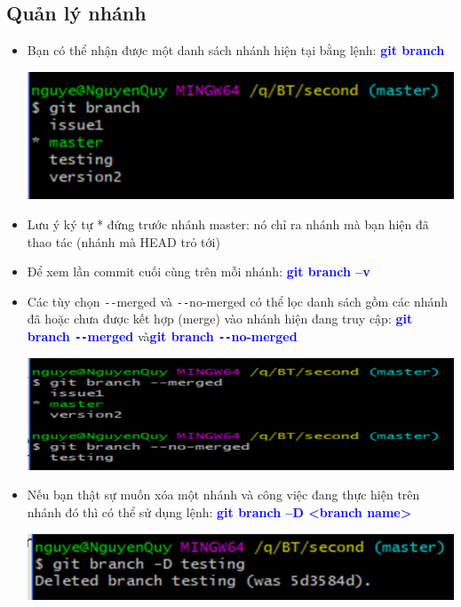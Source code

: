 \documentclass[12pt,a4paper]{report}
\begin{document}
\subsection{Quản lý nhánh}
\begin{itemize}
\item Bạn có thể nhận được một danh sách nhánh hiện tại bằng lệnh: \textcolor{blue}{\bf git branch}

	\includegraphics[width=0.8\linewidth]{screenshot055}
	
	\label{fig:screenshot055}

\item Lưu ý ký tự * đứng trước nhánh master: nó chỉ ra nhánh mà bạn hiện đã thao tác (nhánh mà HEAD trỏ tới)
\item Để xem lần commit cuối cùng trên mỗi nhánh: \textcolor{blue}{\bf git branch –v}
\item Các tùy chọn \texttt{-{}-}merged và \texttt{-{}-}no-merged có thể lọc danh sách gồm các nhánh đã hoặc chưa được kết hợp (merge) vào nhánh hiện đang truy cập: \textcolor{blue}{\bf git branch \texttt{-{}-}merged} và\textcolor{blue}{\bf git branch \texttt{-{}-}no-merged}

	\includegraphics[width=0.8\linewidth]{screenshot056}

	\label{fig:screenshot056}

\item Nếu bạn thật sự muốn xóa một nhánh và công việc đang thực hiện trên nhánh đó thì có thể sử dụng lệnh: \textcolor{blue}{\bf git branch –D <branch name>}

	\includegraphics[width=0.8\linewidth]{screenshot057}

	\label{fig:screenshot057}

\end{itemize}
\end{document}
